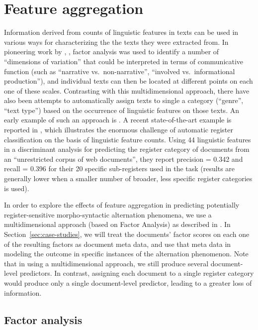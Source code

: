 \section{Feature aggregation}

Information derived from counts of linguistic features in texts can be used in various ways for characterizing the the texts they were extracted from. In pioneering work by \cite{Biber1988},
 \cite{Biber1995}, factor analysis was used to identify a number of ``dimensions of variation'' that could be interpreted in terms of communicative function (such as ``narrative vs.\ non-narrative'', ``involved vs.\ informational production''), and individual texts can then be located at different points on each one of these scales. Contrasting with this multidimensional approach, there have also been attempts to automatically assign texts to single a category (``genre'', ``text type'') based on the occurrence of linguistic features on those texts. An early example of such an approach is \cite{KarlgrenCutting1994}. A recent state-of-the-art example is reported in \cite{EgbertBiberDavis2015}, which illustrates the enormous challenge of automatic register classification on the basis of linguistic feature counts. Using 44 linguistic features in a discriminant analysis for predicting the register category of documents from an ``unrestricted corpus of web documents'', they report precision = 0.342 and recall = 0.396 for their 20 specific sub-registers used in the task (results are generally lower when a smaller number of broader, less specific register categories is used).

In order to explore the effects of feature aggregation in predicting potentially register-sensitive morpho-syntactic alternation phenomena, we use a multidimensional approach (based on Factor Analysis) as described in \cite{Biber1988,Biber1995}. 
In Section~\ref{sec:case-studies}, we will treat the documents' factor scores on each one of the resulting factors as document meta data, and use that meta data in modeling the outcome in specific instances of the alternation phenomenon.
Note that in using a multidimensional approach, we still produce several document-level predictors.
In contrast, assigning each document to a single register category would produce only a single document-level predictor, leading to a greater loss of information.  


\subsection{Factor analysis}

